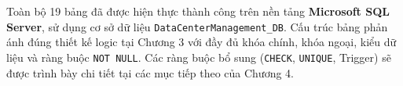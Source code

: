 \noindent Toàn bộ 19 bảng đã được hiện thực thành công trên nền tảng \textbf{Microsoft SQL Server}, sử dụng cơ sở dữ liệu \texttt{DataCenterManagement\_DB}. Cấu trúc bảng phản ánh đúng thiết kế logic tại Chương 3 với đầy đủ khóa chính, khóa ngoại, kiểu dữ liệu và ràng buộc \texttt{NOT NULL}. Các ràng buộc bổ sung (\texttt{CHECK}, \texttt{UNIQUE}, Trigger) sẽ được trình bày chi tiết tại các mục tiếp theo của Chương 4.
